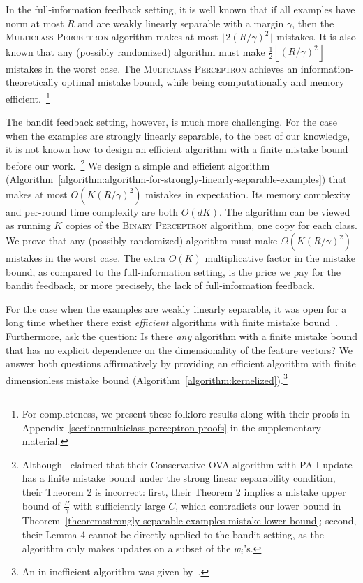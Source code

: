 In the full-information feedback setting, it is well known
\citep{Crammer-Singer-2003} that if all examples have norm at most $R$ and are
weakly linearly separable with a margin $\gamma$, then the \textsc{Multiclass
Perceptron} algorithm makes at most $\lfloor 2(R/\gamma)^2 \rfloor$ mistakes. It
is also known that any (possibly randomized) algorithm must make $\frac{1}{2}
\left\lfloor (R/\gamma)^2 \right \rfloor$ mistakes in the worst case. The
\textsc{Multiclass Perceptron} achieves an information-theoretically optimal
mistake bound, while being computationally and memory efficient.~\footnote{For
completeness, we present these folklore results along with their proofs in
Appendix~\ref{section:multiclass-perceptron-proofs} in the supplementary
material.}

The bandit feedback setting, however, is much more challenging. For the case
when the examples are strongly linearly separable, to the best of our knowledge,
it is not known how to design an efficient algorithm with a finite mistake bound
before our work.~\footnote{Although~\cite{Chen-Chen-Zhang-Chen-Zhang-2009}
claimed that their Conservative OVA algorithm with PA-I update has a finite
mistake bound under the strong linear separability condition, their
Theorem 2 is incorrect: first, their Theorem 2 implies a mistake upper bound of
$\frac{R}{\gamma}$ with sufficiently large $C$, which contradicts our lower
bound in Theorem~\ref{theorem:strongly-separable-examples-mistake-lower-bound};
second, their Lemma 4 cannot be directly applied to the bandit setting, as the
algorithm only makes updates on a subset of the $w_i$'s.} We design a simple and
efficient algorithm
(Algorithm~\ref{algorithm:algorithm-for-strongly-linearly-separable-examples})
that makes at most $O(K (R/\gamma)^2)$ mistakes in expectation. Its memory
complexity and per-round time complexity are both $O(dK)$. The algorithm can be
viewed as running $K$ copies of the \textsc{Binary Perceptron} algorithm, one
copy for each class. We prove that any (possibly randomized) algorithm must make
$\Omega(K (R/\gamma)^2)$ mistakes in the worst case. The extra $O(K)$
multiplicative factor in the mistake bound, as compared to the full-information
setting, is the price we pay for the bandit feedback, or more precisely, the
lack of full-information feedback.

For the case when the examples are weakly linearly separable, it was open for a
long time whether there exist \textit{efficient} algorithms with finite mistake
bound~\cite{Kakade-Shalev-Shwartz-Tewari-2008, Beygelzimer-Orabona-Zhang-2017}.
Furthermore, \citet{Kakade-Shalev-Shwartz-Tewari-2008} ask the question:
Is there \textit{any} algorithm with a finite mistake bound that has no explicit
dependence on the dimensionality of the feature vectors? We answer both
questions affirmatively by providing an efficient algorithm with finite
dimensionless mistake bound (Algorithm~\ref{algorithm:kernelized}).\footnote{An
in inefficient algorithm was given by~\cite{Daniely-Helbertal-2013}.}

